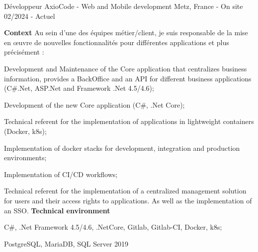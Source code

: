 

\begin{cventries}

  \cventry
    {Développeur} %
    {AxioCode - Web and Mobile development} %
    {Metz, France - On site} %
    {02/2024 - Actuel} %
    {
      \textbf{Context}
      \newline
      Au sein d'une des équipes métier/client, je suis responsable de la mise en œuvre de nouvelles fonctionnalités pour différentes applications et plus précisément :
      \newline \vspace{12pt}
      \begin{cvitems} %
        \item {Development and Maintenance of the Core application that centralizes business information, provides a BackOffice and an API for different business applications (C\#.Net, ASP.Net and Framework .Net 4.5/4.6);}
        \item {Development of the new Core application (C\#, .Net Core);}
        \item {Technical referent for the implementation of applications in lightweight containers (Docker, k8s);}
        \item {Implementation of docker stacks for development, integration and production environments;}
        \item {Implementation of CI/CD workflows;}
      \end{cvitems}
      Technical referent for the implementation of a centralized management solution for users and their access rights to applications. As well as the implementation of an SSO. 
      \newline \vspace{4pt}
      \textbf{Technical environment}
      \newline \vspace{12pt}
      \begin{cvitems}
        \item {C\#, .Net Framework 4.5/4.6, .NetCore, Gitlab, Gitlab-CI, Docker, k8s;}
        \item {PostgreSQL, MariaDB, SQL Server 2019}
      \end{cvitems}
    }


\end{cventries}
